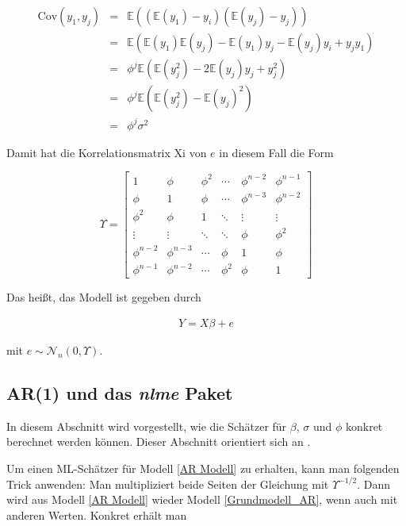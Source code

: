 \documentclass[12pt,a4paper]{article}
\theoremstyle{definition}
\theoremstyle{definition}
\theoremstyle{definition}
\theoremstyle{definition}
\begin{document}
\begin{eqnarray*}
\text{Cov}(y_1, y_j) &=& \mathbb{E}((\mathbb{E}(y_1)-y_i)(\mathbb{E}(y_j)-y_j)) \\
&=& \mathbb{E}(\mathbb{E}(y_1)\mathbb{E}(y_j) - \mathbb{E}(y_1)y_j - \mathbb{E}(y_j)y_i +y_j y_1) \\
&=& \phi^j \mathbb{E}(\mathbb{E}(y_j^2) - 2 \mathbb{E}(y_j)y_j + y_j^2) \\
&=& \phi^j \mathbb{E}(\mathbb{E}(y_j^2)-\mathbb{E}(y_j)^2) \\
&=& \phi^j \sigma^2
\end{eqnarray*}

Damit hat die Korrelationsmatrix \gls{Xi} von $e$ in diesem Fall die Form

\begin{equation}\label{Upsilon}
\Upsilon = 
\left[
   \begin{array}{cccccc}
     1 				& \phi 			& \phi^2	& \cdots	& \phi^{n-2}	& \phi^{n-1} 	\\
     \phi 			& 1		 		& \phi 		& \cdots	& \phi^{n-3}	& \phi^{n-2} 	\\
     \phi^2 		& \phi 			& 1		 	& \ddots	& \vdots		& \vdots 		\\
     \vdots		 	& \vdots	 	& \ddots	& \ddots	& \phi			& \phi^{2} 	\\
     \phi^{n-2} 	& \phi^{n-3}	& \cdots 	& \phi		& 1				& \phi 		\\
     \phi^{n-1} 	& \phi^{n-2} 	& \cdots	& \phi^{2}	& \phi			& 1  
   \end{array}
\right]
\end{equation}

Das heißt, das Modell ist gegeben durch 

\begin{align} \label{AR Modell}
Y = X \beta + e
\end{align}

mit $e \sim \mathscr{N}_{n}(0,\Upsilon)$.



\subsection{AR(1) und das \textit{nlme} Paket}
\label{AR(1) und das nlme Paket}

In diesem Abschnitt wird vorgestellt, wie die Schätzer für $\beta$, $\sigma$ und $\phi$ konkret berechnet werden können. Dieser Abschnitt orientiert sich an \cite[203-205]{Pinheiro00}.

Um einen ML-Schätzer für Modell \eqref{AR Modell} zu erhalten, kann man folgenden Trick anwenden: Man multipliziert beide Seiten der Gleichung mit $\Upsilon^{-1/2}$. Dann wird aus Modell \eqref{AR Modell} wieder Modell \eqref{Grundmodell_AR}, wenn auch mit anderen Werten. Konkret erhält man
\end{document}
